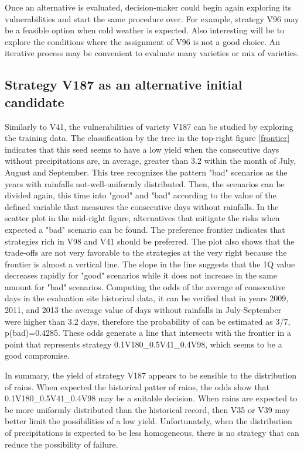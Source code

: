 \documentclass[syngen,nonblindrev]{informs3-syngen}
\begin{document}
Once an alternative is evaluated, decision-maker could begin again exploring its vulnerabilities and start the same procedure over. 
For example, strategy V96 may be a feasible option when cold weather is expected. 
Also interesting will be to explore the conditions where the assignment of V96 is not a good choice.
An iterative process may be convenient to evaluate many varieties or mix of varieties. 

\subsection {Strategy V187 as an alternative initial candidate}
 
Similarly to V41, the vulnerabilities of variety V187 can be studied by exploring the training data. 
The classification by the tree in the top-right figure \ref{frontier} indicates that this seed seems to have a low yield when the consecutive days without precipitations are, in average, greater than 3.2 within the month of July, August and September. 
This tree recognizes the pattern "bad" scenarios as the years with rainfalls not-well-uniformly distributed. 
Then, the scenarios can be divided again, this time into "good" and "bad" according to the value of the defined variable that measures the consecutive days without rainfalls. 
In the scatter plot in the mid-right figure, alternatives that mitigate the risks when expected a "bad" scenario can be found.
The preference frontier indicates that strategies rich in V98 and V41 should be preferred.
The plot also shows that the trade-offs are not very favorable to the strategies at the very right because the frontier is almost a vertical line. 
The slope in the line suggests that the 1Q value decreases rapidly for "good" scenarios while it does not increase in the same amount for "bad" scenarios. 
Computing the odds of the average of consecutive days in the evaluation site historical data, it can be verified that in years 2009, 2011, and 2013 the average value of days without rainfalls in July-September were higher than 3.2 days, therefore the probability of can be estimated as 3/7, p(bad)=0.4285. 
These odds generate a line that intersects with the frontier in a point that represents strategy 0.1V180\_0.5V41\_0.4V98, which seems to be a good compromise.

In summary, the yield of strategy V187 appears to be sensible to the distribution of rains. 
When expected the historical patter of rains, the odds show that 0.1V180\_0.5V41\_0.4V98 may be a suitable decision. 
When rains are expected to be more uniformly distributed than the historical record, then V35 or V39 may better limit the possibilities of a low yield. 
Unfortunately, when the distribution of precipitations is expected to be less homogeneous, there is no strategy that can reduce the possibility of failure.
\end{document}
